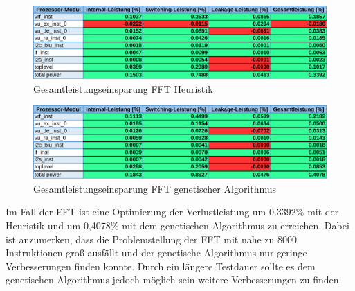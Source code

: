 \begin{figure}[H]
	\centering
	\includegraphics[width=\textwidth]{fig/fft_vergleich_heuristik.pdf}
	\caption{Gesamtleistungseinsparung FFT Heuristik}
	\label{fig:fft_vergleich_heuristik}
\end{figure}
\begin{figure}[H]
	\centering
	\includegraphics[width=\textwidth]{fig/fft_vergleich_genetisch.pdf}
	\caption{Gesamtleistungseinsparung FFT genetischer Algorithmus}
	\label{fig:fft_vergleich_genetisch}
\end{figure}

Im Fall der FFT ist eine Optimierung der Verlustleistung um 0.3392\% mit der Heuristik und um 0,4078\% mit dem genetischen Algorithmus zu erreichen. Dabei ist anzumerken, dass die Problemstellung der FFT mit nahe zu 8000 Instruktionen groß ausfällt und der genetische Algorithmus nur geringe Verbesserungen finden konnte. Durch ein längere Testdauer sollte es dem genetischen Algorithmus jedoch möglich sein weitere Verbesserungen zu finden.





